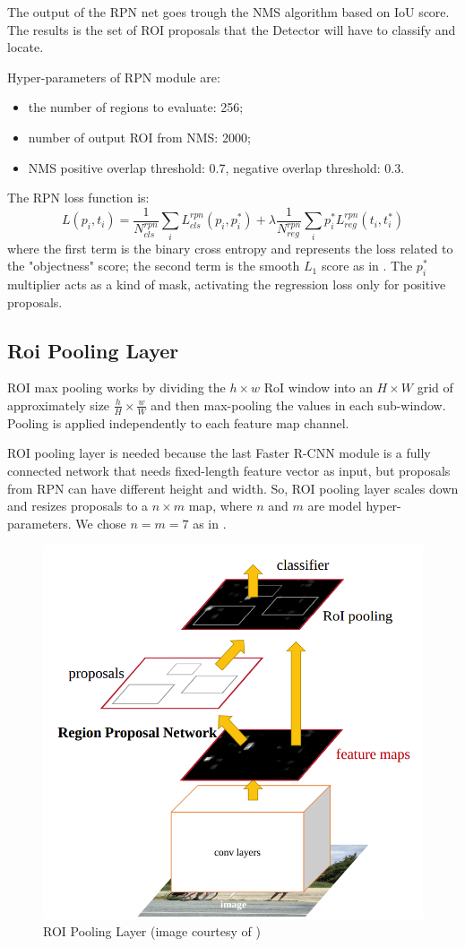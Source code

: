 \documentclass[a4paper,10pt]{report}
\begin{document}
The output of the RPN net goes trough the NMS algorithm based on IoU score. The results is the set of ROI proposals that the Detector will have to classify and locate.

Hyper-parameters of RPN module are:
\begin{itemize}
    \item the number of regions to evaluate: 256;
    \item number of output ROI from NMS: 2000;
    \item NMS positive overlap threshold: 0.7, negative overlap threshold: 0.3.
\end{itemize}

The RPN loss function is:
\[L({p_i}, {t_i}) = \dfrac{1}{N_{cls}^{rpn}} \sum_{i} L_{cls}^{rpn}(p_i, p_i^*) + \lambda \dfrac{1}{N_{reg}^{rpn}} \sum_{i} p_i^* L_{reg}^{rpn}(t_i, t_i^*) \]	
where the first term is the binary cross entropy and represents the loss related to the "objectness" score; the second term is the smooth $L_1$ score as in \cite{huber-loss}. The $p_i^*$ multiplier acts as a kind of mask, activating the regression loss only for positive proposals.

\subsection{Roi Pooling Layer}\label{subsec:roi-pooling}
ROI max pooling works by dividing the $h \times w$ RoI window into an $H \times W$ grid of approximately size $\frac{h}{H} \times \frac{w}{W}$ and then max-pooling the values in each sub-window. Pooling is applied independently to each feature map channel.

ROI pooling layer is needed because the last Faster R-CNN module is a fully connected network that needs fixed-length feature vector as input, but proposals from RPN can have different height and width. So, ROI pooling layer scales down and resizes proposals to a $n \times m$ map, where $n$ and $m$ are model hyper-parameters. We chose $n=m=7$ as in \cite{faster-rcnn}.
\begin{figure}[h]
  \center
  \includegraphics[width=0.5\linewidth]{roi-pooling}
  \caption{ROI Pooling Layer (image courtesy of \cite{roi-pooling})}
  \label{fig:roi-pooling}
\end{figure}
\end{document}
